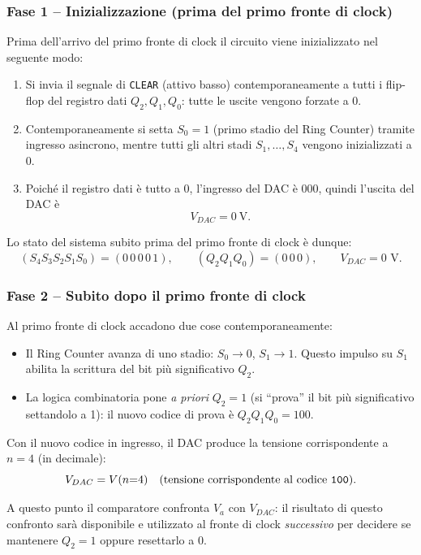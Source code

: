 \documentclass[11pt,a4paper]{report}
\begin{document}
\bigskip
\subsubsection{Fase 1 -- Inizializzazione (prima del primo fronte di clock)}

Prima dell'arrivo del primo fronte di clock il circuito viene inizializzato nel seguente modo:

\begin{enumerate}
    \item Si invia il segnale di \texttt{CLEAR} (attivo basso) contemporaneamente a tutti i flip-flop del registro dati $Q_2,Q_1,Q_0$: tutte le uscite vengono forzate a 0.
    \item Contemporaneamente si setta $S_0=1$ (primo stadio del Ring Counter) tramite ingresso asincrono, mentre tutti gli altri stadi $S_1,\dots,S_4$ vengono inizializzati a 0.
    \item Poich\'e il registro dati è tutto a 0, l'ingresso del DAC è $000$, quindi l'uscita del DAC è
    \[
        V_{DAC} = 0\ \text{V}.
    \]
\end{enumerate}

Lo stato del sistema subito prima del primo fronte di clock è dunque:
\[
(S_4 S_3 S_2 S_1 S_0) = (0\,0\,0\,0\,1), \qquad (Q_2 Q_1 Q_0) = (0\,0\,0), \qquad V_{DAC}=0\text{ V}.
\]

\bigskip
\subsubsection{Fase 2 -- Subito dopo il primo fronte di clock}

Al primo fronte di clock accadono due cose contemporaneamente:

\begin{itemize}
    \item Il Ring Counter avanza di uno stadio: $S_0 \to 0$, $S_1 \to 1$. Questo impulso su $S_1$ abilita la scrittura del bit più significativo $Q_2$.
    \item La logica combinatoria pone \emph{a priori} $Q_2 = 1$ (si ``prova'' il bit più significativo settandolo a 1): il nuovo codice di prova è $Q_2Q_1Q_0 = 100$.
\end{itemize}

Con il nuovo codice in ingresso, il DAC produce la tensione corrispondente a $n=4$ (in decimale):
\[
V_{DAC} = V(n{=}4) \quad \text{(tensione corrispondente al codice \texttt{100})}.
\]

A questo punto il comparatore confronta $V_a$ con $V_{DAC}$: il risultato di questo confronto sarà disponibile e utilizzato al fronte di clock \emph{successivo} per decidere se mantenere $Q_2=1$ oppure resettarlo a 0.
\end{document}
